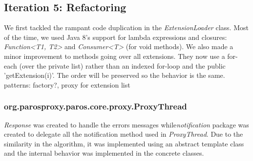 \subsection{Iteration 5: Refactoring}
We first tackled the rampant code duplication in  the \textit{ExtensionLoader} class. Most of the time, we used Java 8's support for lambda expressions and closures: \textit{Function<T1, T2>} and \textit{Consumer<T>} (for void methods).
We also made a minor improvement to methods going over all extensions. They now use a for-each (over the private list) rather than an indexed for-loop and the public 'getExtension(i)'. The order will be preserved so the behavior is the same.
patterns: factory?, proxy for extension list
\subsubsection{org.parosproxy.paros.core.proxy.ProxyThread}

\textit{Response} was created to handle the errors messages while\textit{notification} package was created to delegate all the notification method used in \textit{ProxyThread}. Due to the similarity in the algorithm, it was implemented using an abstract template class and the internal behavior was implemented in the concrete classes.

